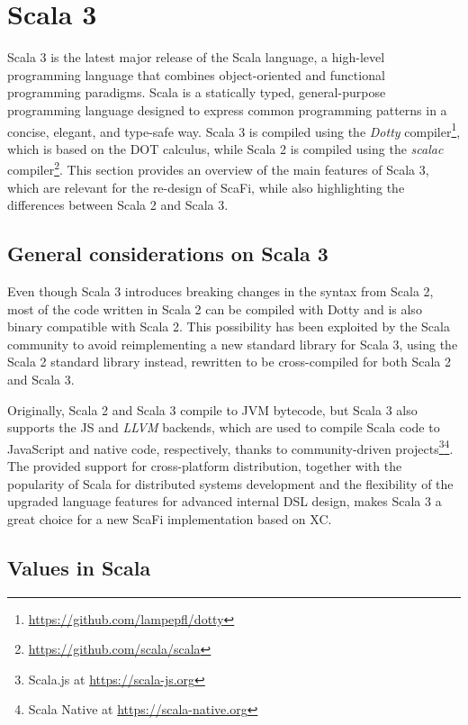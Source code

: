 \section{Scala 3}\label{chap:background->sec:scala3}

Scala 3 is the latest major release of the Scala language, a high-level programming language that combines object-oriented and functional programming paradigms.
%
Scala is a statically typed, general-purpose programming language designed to express common programming patterns in a concise, elegant, and type-safe way.
%
Scala 3 is compiled using the \textit{Dotty} compiler\footnote{\url{https://github.com/lampepfl/dotty}}, which is based on the \ac{DOT} calculus\cite{dot}, while Scala 2 is compiled using the \textit{scalac} compiler\footnote{\url{https://github.com/scala/scala}}.
%
This section provides an overview of the main features of Scala 3, which are relevant for the re-design of ScaFi, while also highlighting the differences between Scala 2 and Scala 3.

\subsection{General considerations on Scala 3}

Even though Scala 3 introduces breaking changes in the syntax from Scala 2, most of the code written in Scala 2 can be compiled with Dotty and is also binary compatible with Scala 2.
%
This possibility has been exploited by the Scala community to avoid reimplementing a new standard library for Scala 3, using the Scala 2 standard library instead, rewritten to be cross-compiled for both Scala 2 and Scala 3.

Originally, Scala 2 and Scala 3 compile to \ac{JVM} bytecode, but Scala 3 also supports the \ac{JS} and \textit{LLVM} backends, which are used to compile Scala code to JavaScript and native code, respectively, thanks to community-driven projects\footnote{Scala.js at \url{https://scala-js.org}}\footnote{Scala Native at \url{https://scala-native.org}}\cite{scala-js}.
%
The provided support for cross-platform distribution, together with the popularity of Scala for distributed systems development\cite{scala-popularity} and the flexibility of the upgraded language features for advanced internal \ac{DSL} design, makes Scala 3 a great choice for a new ScaFi implementation based on \ac{XC}.

\subsection{Values in Scala}

